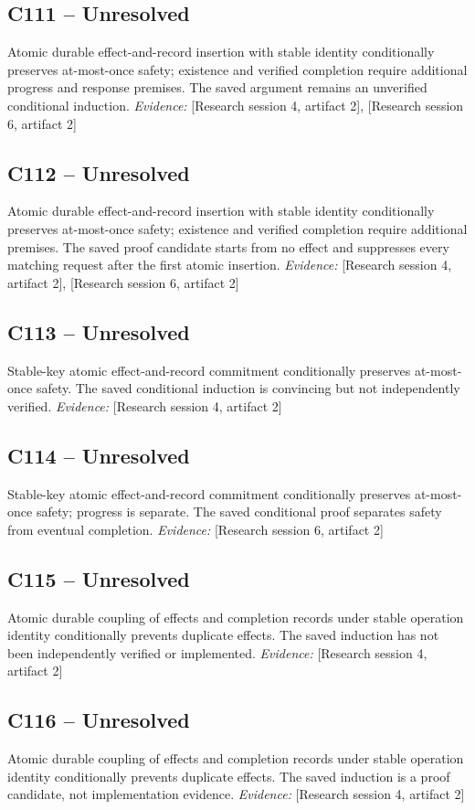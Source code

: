 \documentclass[11pt]{article}
\begin{document}
\begin{sloppypar}
\subsection{C111 -- Unresolved}
Atomic durable effect-and-record insertion with stable identity conditionally preserves at-most-once safety; existence and verified completion require additional progress and response premises.
The saved argument remains an unverified conditional induction.
\textit{Evidence: }[Research session 4, artifact 2], [Research session 6, artifact 2]
\subsection{C112 -- Unresolved}
Atomic durable effect-and-record insertion with stable identity conditionally preserves at-most-once safety; existence and verified completion require additional premises.
The saved proof candidate starts from no effect and suppresses every matching request after the first atomic insertion.
\textit{Evidence: }[Research session 4, artifact 2], [Research session 6, artifact 2]
\subsection{C113 -- Unresolved}
Stable-key atomic effect-and-record commitment conditionally preserves at-most-once safety.
The saved conditional induction is convincing but not independently verified.
\textit{Evidence: }[Research session 4, artifact 2]
\subsection{C114 -- Unresolved}
Stable-key atomic effect-and-record commitment conditionally preserves at-most-once safety; progress is separate.
The saved conditional proof separates safety from eventual completion.
\textit{Evidence: }[Research session 6, artifact 2]
\subsection{C115 -- Unresolved}
Atomic durable coupling of effects and completion records under stable operation identity conditionally prevents duplicate effects.
The saved induction has not been independently verified or implemented.
\textit{Evidence: }[Research session 4, artifact 2]
\subsection{C116 -- Unresolved}
Atomic durable coupling of effects and completion records under stable operation identity conditionally prevents duplicate effects.
The saved induction is a proof candidate, not implementation evidence.
\textit{Evidence: }[Research session 4, artifact 2]

\end{sloppypar}
\end{document}
